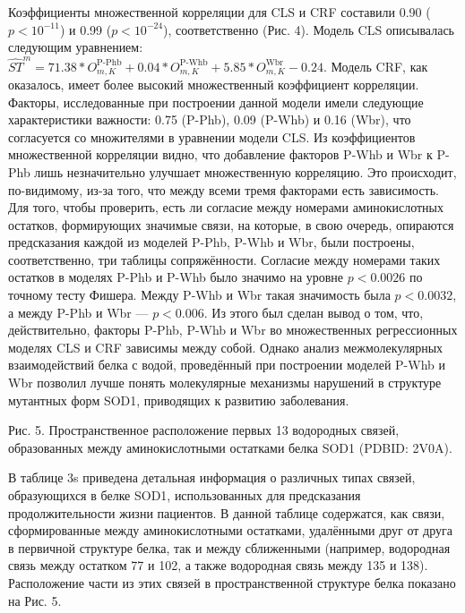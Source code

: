 Коэффициенты множественной корреляции для CLS и CRF составили 0.90 ($p < 10^{-11}$) и 0.99 ($p < 10^{-24}$), соответственно (Рис. 4). Модель CLS описывалась следующим уравнением:  $\widehat{ST}^m = 71.38*O_{m, K}^{\text{P-Phb}}+0.04*O_{m, K}^{\text{P-Whb}}+5.85*O_{m, K}^{\text{Wbr}}-0.24$. Модель CRF, как оказалось, имеет более высокий множественный коэффициент корреляции. Факторы, исследованные при построении данной модели имели следующие характеристики важности: 0.75 (P-Phb), 0.09 (P-Whb) и 0.16 (Wbr), что согласуется со множителями в уравнении модели CLS.
Из коэффициентов множественной корреляции видно, что добавление факторов P-Whb и Wbr к P-Phb лишь незначительно улучшает множественную корреляцию. Это происходит, по-видимому, из-за того, что между всеми тремя факторами есть зависимость. Для того, чтобы проверить, есть ли согласие между номерами аминокислотных остатков, формирующих значимые связи, на которые, в свою очередь, опираются предсказания каждой из моделей P-Phb, P-Whb и Wbr, были построены, соответственно, три таблицы сопряжённости. Согласие между номерами таких остатков в моделях P-Phb и P-Whb было значимо на уровне $p < 0.0026$ по точному тесту Фишера. Между P-Whb и Wbr такая значимость была $p < 0.0032$, а между P-Phb и Wbr — $p < 0.006$. Из этого был сделан вывод о том, что, действительно, факторы P-Phb, P-Whb и Wbr во множественных регрессионных моделях CLS и CRF зависимы между собой. Однако анализ межмолекулярных взаимодействий белка с водой, проведённый при построении моделей P-Whb и Wbr позволил лучше понять молекулярные механизмы нарушений в структуре мутантных форм SOD1, приводящих к развитию заболевания.

Рис. 5. Пространственное расположение первых 13 водородных связей, образованных между аминокислотными остатками белка SOD1 (PDBID: 2V0A).

В таблице 3s приведена детальная информация о различных типах связей, образующихся в белке SOD1, использованных для предсказания продолжительности жизни пациентов. В данной таблице содержатся, как связи, сформированные между аминокислотными остатками, удалёнными друг от друга в первичной структуре белка, так и между сближенными (например, водородная связь между остатком 77 и 102, а также водородная связь между 135 и 138). Расположение части из этих связей в пространственной структуре белка показано на Рис. 5.  

